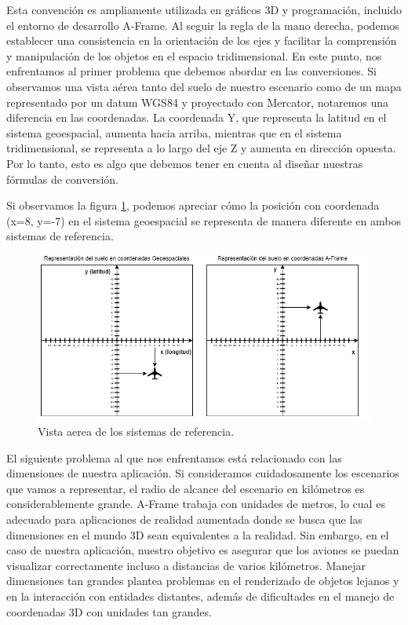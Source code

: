 \documentclass[a4paper, 11pt]{book}
\begin{document}
Esta convención es ampliamente utilizada en gráficos 3D y programación, incluido el entorno de desarrollo A-Frame. Al seguir la regla de la mano derecha, podemos establecer una consistencia en la orientación de los ejes y facilitar la comprensión y manipulación de los objetos en el espacio tridimensional.
En este punto, nos enfrentamos al primer problema que debemos abordar en las conversiones. Si observamos una vista aérea tanto del suelo de nuestro escenario como de un mapa representado por un datum WGS84 y proyectado con Mercator, notaremos una diferencia en las coordenadas.
La coordenada Y, que representa la latitud en el sistema geoespacial, aumenta hacia arriba, mientras que en el sistema tridimensional, se representa a lo largo del eje Z y aumenta en dirección opuesta. Por lo tanto, esto es algo que debemos tener en cuenta al diseñar nuestras fórmulas de conversión.

Si observamos la figura \ref{fig:sistemasDeReferencia}, podemos apreciar cómo la posición con coordenada (x=8, y=-7) en el sistema geoespacial se representa de manera diferente en ambos sistemas de referencia.
\begin{figure}[H]
  \centering
  \includegraphics[width=13cm, keepaspectratio]{img/sistemasDeReferencia.drawio.png}
  \caption{Vista aerea de los sistemas de referencia.}
  \label{fig:sistemasDeReferencia}
\end{figure}

El siguiente problema al que nos enfrentamos está relacionado con las dimensiones de nuestra aplicación. Si consideramos cuidadosamente los escenarios que vamos a representar, el radio de alcance del escenario en kilómetros es considerablemente grande. A-Frame trabaja con unidades de metros, lo cual es adecuado para aplicaciones de realidad aumentada donde se busca que las dimensiones en el mundo 3D sean equivalentes a la realidad. Sin embargo, en el caso de nuestra aplicación, nuestro objetivo es asegurar que los aviones se puedan visualizar correctamente incluso a distancias de varios kilómetros. Manejar dimensiones tan grandes plantea problemas en el renderizado de objetos lejanos y en la interacción con entidades distantes, además de dificultades en el manejo de coordenadas 3D con unidades tan grandes.
\end{document}
